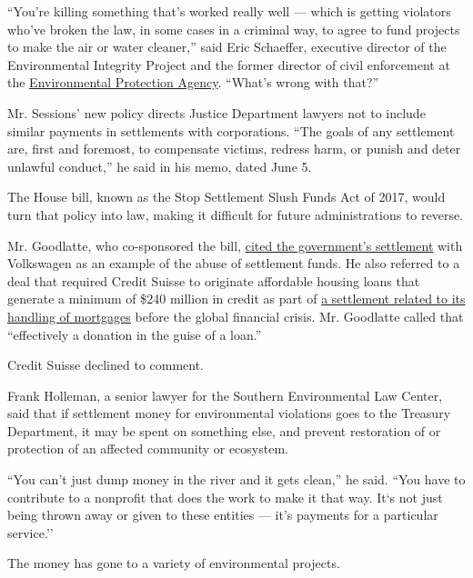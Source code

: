 ``You're killing something that's worked really well --- which is
getting violators who've broken the law, in some cases in a criminal
way, to agree to fund projects to make the air or water cleaner,'' said
Eric Schaeffer, executive director of the Environmental Integrity
Project and the former director of civil enforcement at the
\href{https://www.nytimes3xbfgragh.onion/topic/organization/environmental-protection-agency}{Environmental
Protection Agency}. ``What's wrong with that?''

Mr. Sessions' new policy directs Justice Department lawyers not to
include similar payments in settlements with corporations. ``The goals
of any settlement are, first and foremost, to compensate victims,
redress harm, or punish and deter unlawful conduct,'' he said in his
memo, dated June 5.

The House bill, known as the Stop Settlement Slush Funds Act of 2017,
would turn that policy into law, making it difficult for future
administrations to reverse.

Mr. Goodlatte, who co-sponsored the bill,
\href{https://judiciary.house.gov/press-release/statement-house-judiciary-committee-chairman-bob-goodlatte-markup-h-r-732-stop-settlement-slush-funds-act-2017/}{cited
the government's settlement} with Volkswagen as an example of the abuse
of settlement funds. He also referred to a deal that required Credit
Suisse to originate affordable housing loans that generate a minimum of
\$240 million in credit as part of
\href{https://www.nytimes3xbfgragh.onion/2016/12/23/business/dealbook/credit-suisse-mortgage-investigation.html}{a
settlement related to its handling of mortgages} before the global
financial crisis. Mr. Goodlatte called that ``effectively a donation in
the guise of a loan.''

Credit Suisse declined to comment.

Frank Holleman, a senior lawyer for the Southern Environmental Law
Center, said that if settlement money for environmental violations goes
to the Treasury Department, it may be spent on something else, and
prevent restoration of or protection of an affected community or
ecosystem.

``You can't just dump money in the river and it gets clean,'' he said.
``You have to contribute to a nonprofit that does the work to make it
that way. It`s not just being thrown away or given to these entities ---
it's payments for a particular service.''

The money has gone to a variety of environmental projects.

